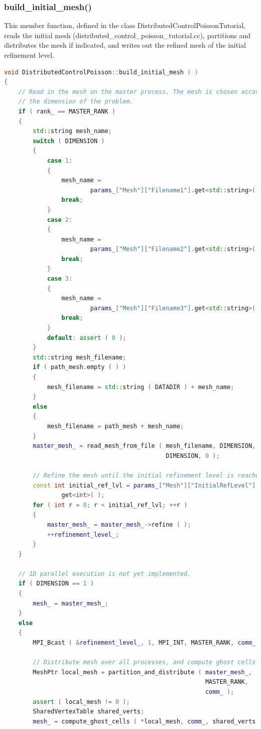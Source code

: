 \documentclass[a4paper, 11pt, twoside]{article}
\begin{document}
\subsubsection{build\_initial\_mesh()}\label{read-mesh}
This member function, defined in the class DistributedControlPoissonTutorial, reads the initial mesh (distributed\_control\_poisson\_tutorial.cc), partitions and distributes the mesh if indicated, and writes out the refined mesh of the initial refinement level.

\begin{lstlisting}[language=C++, basicstyle={\footnotesize, \ttfamily}, keywordstyle=\color{blue}, numbers=none, tabsize=4]
void DistributedControlPoisson::build_initial_mesh ( )
{
    // Read in the mesh on the master process. The mesh is chosen according to
    // the dimension of the problem.
    if ( rank_ == MASTER_RANK )
    {
        std::string mesh_name;
        switch ( DIMENSION )
        {
            case 1:
            {
                mesh_name =
                        params_["Mesh"]["Filename1"].get<std::string>( );
                break;
            }
            case 2:
            {
                mesh_name =
                        params_["Mesh"]["Filename2"].get<std::string>( );
                break;
            }
            case 3:
            {
                mesh_name =
                        params_["Mesh"]["Filename3"].get<std::string>( );
                break;
            }
            default: assert ( 0 );
        }
        std::string mesh_filename;
        if ( path_mesh.empty ( ) )
        {
            mesh_filename = std::string ( DATADIR ) + mesh_name;
        }
        else
        {
            mesh_filename = path_mesh + mesh_name;
        }
        master_mesh_ = read_mesh_from_file ( mesh_filename, DIMENSION,
                                             DIMENSION, 0 );

        // Refine the mesh until the initial refinement level is reached.
        const int initial_ref_lvl = params_["Mesh"]["InitialRefLevel"].
                get<int>( );
        for ( int r = 0; r < initial_ref_lvl; ++r )
        {
            master_mesh_ = master_mesh_->refine ( );
            ++refinement_level_;
        }
    }

    // 1D parallel execution is not yet implemented.
    if ( DIMENSION == 1 )
    {
        mesh_ = master_mesh_;
    }
    else
    {
        MPI_Bcast ( &refinement_level_, 1, MPI_INT, MASTER_RANK, comm_ );

        // Distribute mesh over all processes, and compute ghost cells
        MeshPtr local_mesh = partition_and_distribute ( master_mesh_, 
                                                        MASTER_RANK,
                                                        comm_ );
        assert ( local_mesh != 0 );
        SharedVertexTable shared_verts;
        mesh_ = compute_ghost_cells ( *local_mesh, comm_, shared_verts );


\end{lstlisting}
\end{document}
